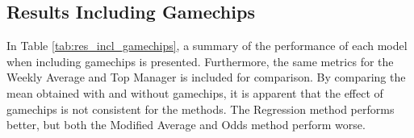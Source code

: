 \begin{table}[H]
\centering
{}
\caption{Performance of Modified Average and \cite{Bonomo}}
\label{tab:bonomo_mofidified_average}
\end{table}


\subsection{Results Including Gamechips}

In Table \ref{tab:res_incl_gamechips}, a summary of the performance of each model when including gamechips is presented. Furthermore, the same metrics for the Weekly Average and Top Manager is included for comparison. By comparing the mean obtained with and without gamechips, it is apparent that the effect of gamechips is not consistent for the methods. The Regression method performs better, but both the Modified Average and Odds method perform worse.

\begin{table}[H]
\centering
{}
\caption{Results including gamechips.}
\label{tab:res_incl_gamechips}
\end{table}



